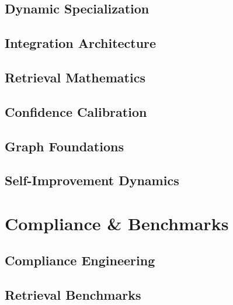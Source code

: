 \documentclass[11pt,a4paper,twoside]{book}
\theoremstyle{definition}
\theoremstyle{remark}
\begin{document}
\chapter{Dynamic Specialization}
\label{ch:specialization}


\chapter{Integration Architecture}
\label{ch:integration}


\chapter{Retrieval Mathematics}
\label{ch:retrieval_math}


\chapter{Confidence Calibration}
\label{ch:confidence_calibration}


\chapter{Graph Foundations}
\label{ch:graph_foundations}


\chapter{Self-Improvement Dynamics}
\label{ch:self_improvement_dynamics}


\part{Compliance \& Benchmarks}

\chapter{Compliance Engineering}
\label{ch:compliance}


\chapter{Retrieval Benchmarks}
\label{ch:retrieval_benchmarks}

\end{document}
